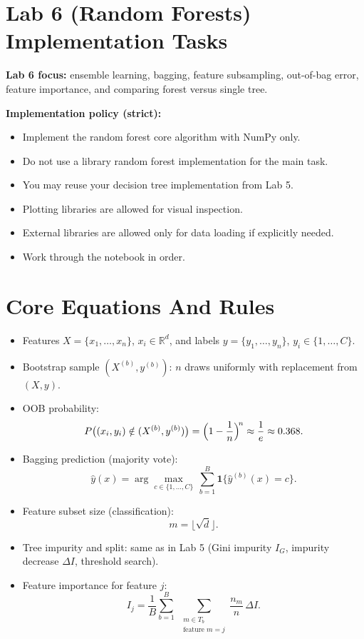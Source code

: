 \section*{Lab 6 (Random Forests) Implementation Tasks}
\textbf{Lab 6 focus:} ensemble learning, bagging, feature subsampling, out-of-bag error, feature importance, and comparing forest versus single tree.

\medskip
\textbf{Implementation policy (strict):}
\begin{itemize}
  \item Implement the random forest core algorithm with NumPy only.
  \item Do not use a library random forest implementation for the main task.
  \item You may reuse your decision tree implementation from Lab 5.
  \item Plotting libraries are allowed for visual inspection.
  \item External libraries are allowed only for data loading if explicitly needed.
  \item Work through the notebook in order.
\end{itemize}

\section*{Core Equations And Rules}
\begin{itemize}
  \item Features $X=\{x_1,\dots,x_n\}$, $x_i\in\mathbb{R}^d$, and labels $y=\{y_1,\dots,y_n\}$, $y_i\in\{1,\dots,C\}$.
  \item Bootstrap sample $(X^{(b)},y^{(b)})$: $n$ draws uniformly with replacement from $(X,y)$.
  \item OOB probability:
  \[
    P\bigl((x_i,y_i)\notin (X^{(b)},y^{(b)})\bigr)=\Bigl(1-\frac{1}{n}\Bigr)^{\!n}\approx\frac{1}{e}\approx 0.368.
  \]
  \item Bagging prediction (majority vote):
  \[
    \hat{y}(x)
    =
    \arg\max_{c\in\{1,\dots,C\}}\,
    \sum_{b=1}^{B}\mathbf{1}\{\hat{y}^{(b)}(x)=c\}.
  \]
  \item Feature subset size (classification):
  \[
    m = \lfloor\sqrt{d}\rfloor.
  \]
  \item Tree impurity and split: same as in Lab 5 (Gini impurity $I_G$, impurity decrease $\Delta I$, threshold search).
  \item Feature importance for feature $j$:
  \[
    I_j
    =
    \frac{1}{B}
    \sum_{b=1}^{B}\;
    \sum_{\substack{m\in T_b\\ \text{feature }m=j}}
    \frac{n_m}{n}\,\Delta I.
  \]
\end{itemize}

